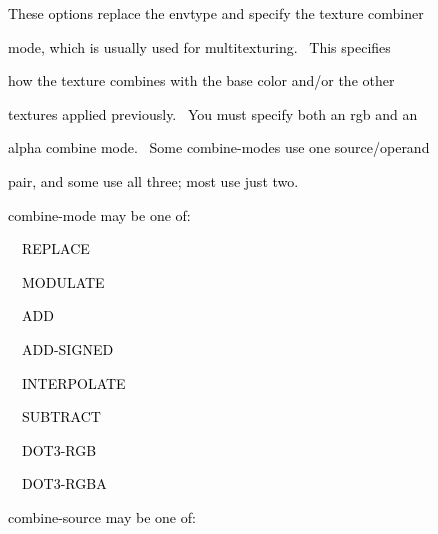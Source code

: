 \documentclass[a4paper]{article}
\newcommand\textstyleOOoComputerKeyWord[1]{\textrm{\textcolor[rgb]{0.0,0.0,0.5019608}{#1}}}
\begin{document}
\bigskip

{\color{black}
\textstyleOOoComputerKeyWord{\textcolor{black}{\ \ \ \ These options replace the envtype and specify the texture
combiner}}}

{\color{black}
\textstyleOOoComputerKeyWord{\textcolor{black}{\ \ \ \ mode, which is usually used for multitexturing. \ This
specifies}}}

{\color{black}
\textstyleOOoComputerKeyWord{\textcolor{black}{\ \ \ \ how the texture combines with the base color and/or the other}}}

{\color{black}
\textstyleOOoComputerKeyWord{\textcolor{black}{\ \ \ \ textures applied previously. \ You must specify both an rgb and
an}}}

{\color{black}
\textstyleOOoComputerKeyWord{\textcolor{black}{\ \ \ \ alpha combine mode. \ Some combine-modes use one
source/operand}}}

{\color{black}
\textstyleOOoComputerKeyWord{\textcolor{black}{\ \ \ \ pair, and some use all three; most use just two.}}}


\bigskip

{\color{black}
\textstyleOOoComputerKeyWord{\textcolor{black}{\ \ \ \ combine-mode may be one of:}}}


\bigskip

{\color{black}
\textstyleOOoComputerKeyWord{\textcolor{black}{\ \ \ \ \ \ REPLACE}}}

{\color{black}
\textstyleOOoComputerKeyWord{\textcolor{black}{\ \ \ \ \ \ MODULATE}}}

{\color{black}
\textstyleOOoComputerKeyWord{\textcolor{black}{\ \ \ \ \ \ ADD}}}

{\color{black}
\textstyleOOoComputerKeyWord{\textcolor{black}{\ \ \ \ \ \ ADD-SIGNED}}}

{\color{black}
\textstyleOOoComputerKeyWord{\textcolor{black}{\ \ \ \ \ \ INTERPOLATE}}}

{\color{black}
\textstyleOOoComputerKeyWord{\textcolor{black}{\ \ \ \ \ \ SUBTRACT}}}

{\color{black}
\textstyleOOoComputerKeyWord{\textcolor{black}{\ \ \ \ \ \ DOT3-RGB}}}

{\color{black}
\textstyleOOoComputerKeyWord{\textcolor{black}{\ \ \ \ \ \ DOT3-RGBA}}}


\bigskip

{\color{black}
\textstyleOOoComputerKeyWord{\textcolor{black}{\ \ \ \ combine-source may be one of:}}}


\bigskip
\end{document}
